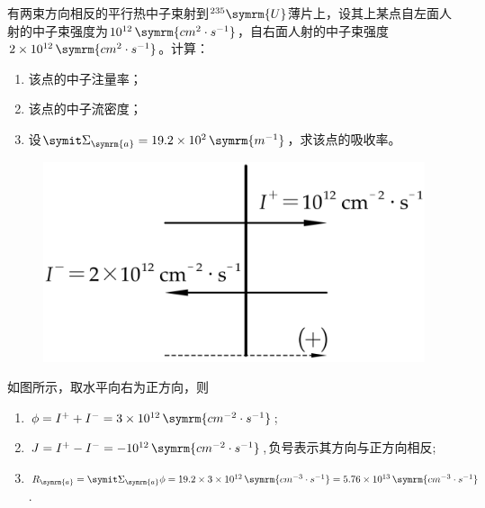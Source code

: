 \begin{exercise}
    有两束方向相反的平行热中子束射到${}^{235}\symrm{U}$薄片上，设其上某点自左面人射的中子束强度为$10^{12}\,\symrm{cm^2\cdot s^{-1}}$，自右面人射的中子束强度$2 \times 10^{12}\,\symrm{cm^2\cdot s^{-1}}$。计算：
    \begin{enumerate}[(1)]
        \item 该点的中子注量率；
        \item 该点的中子流密度；
        \item 设$\vSigma_{\symrm{a}} = 19.2 \times 10^2\,\symrm{m^{-1}}$，求该点的吸收率。
    \end{enumerate}
    \begin{solution}
        \begin{figure}[H]
            \centering
            \includegraphics[scale=1.5]{figures/fig4.2.png}
        \end{figure}
        如图所示，取水平向右为正方向，则
        \begin{enumerate}[(1)]
            \item $\phi = I^{+} + I^{-} = 3\times 10^{12}\,\symrm{cm^{-2}\cdot s^{-1}}$;
            \item $J = I^{+} - I^{-} = -10^{12}\,\symrm{cm^{-2}\cdot s^{-1}}$,\,负号表示其方向与正方向相反;
            \item $R_{\symrm{a}} = \vSigma_{\symrm{a}}\phi = 19.2\times 3\times 10^{12}\,\symrm{cm^{-3}\cdot s^{-1}} = 5.76\times 10^{13}\,\symrm{cm^{-3}\cdot s^{-1}}$.
        \end{enumerate}
    \end{solution}
\end{exercise}

